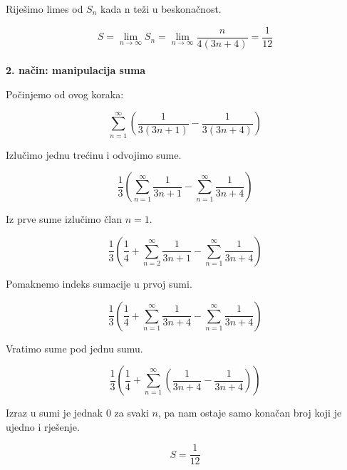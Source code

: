 \documentclass[exam.tex]{subfiles}
\begin{document}
	Riješimo limes od \( S_n \) kada n teži u beskonačnost.
	
	\[ S = \lim_{n \to \infty} S_n = \lim_{n \to \infty} \frac{n}{4(3n + 4)} = \frac{1}{12} \] \\
	
	\textbf{2. način: manipulacija suma} 
	
	Počinjemo od ovog koraka:	
	
	\[ \sum\limits_{n=1}^\infty \left ( \frac{1}{3(3n + 1)} - \frac{1}{3(3n + 4)} \right ) \] 
	
	Izlučimo jednu trećinu i odvojimo sume.
	
	\[ \frac{1}{3} \left ( \sum\limits_{n=1}^\infty \frac{1}{3n + 1} - \sum\limits_{n=1}^\infty \frac{1}{3n + 4} \right ) \] 
	
	Iz prve sume izlučimo član \( n = 1 \).
	
	\[ \frac{1}{3} \left ( \frac{1}{4} + \sum\limits_{n=2}^\infty \frac{1}{3n + 1} - \sum\limits_{n=1}^\infty \frac{1}{3n + 4} \right ) \] 
	
	Pomaknemo indeks sumacije u prvoj sumi.
	
	\[ \frac{1}{3} \left ( \frac{1}{4} + \sum\limits_{n=1}^\infty \frac{1}{3n + 4} - \sum\limits_{n=1}^\infty \frac{1}{3n + 4} \right ) \] 
	
	Vratimo sume pod jednu sumu.
	
	\[ \frac{1}{3} \left ( \frac{1}{4} + \sum\limits_{n=1}^\infty \left ( \frac{1}{3n + 4} - \frac{1}{3n + 4} \right ) \right ) \] 
	
	Izraz u sumi je jednak \( 0 \) za svaki \( n \), pa nam ostaje samo konačan broj koji je ujedno i rješenje.
	
	\[ S = \frac{1}{12} \]
\end{document}
